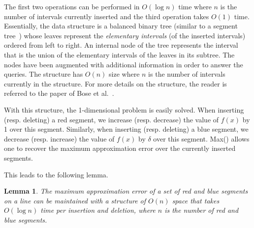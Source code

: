 \documentclass{elsart}
\newtheorem{lemma}[definition]{Lemma}
\begin{document}
The first two operations can be performed in $O(\log n)$ time where
$n$ is the number of intervals currently inserted and the third
operation takes $O(1)$ time.
  Essentially, the data structure is a
  balanced binary tree (similar to a segment tree~\cite{bkos-cgaa-97}) whose
  leaves represent the \emph{elementary intervals} (of the inserted
  intervals) ordered from left to right. An internal node of the tree
  represents the interval that is the union of the elementary intervals
  of the leaves in its subtree.  The nodes have been augmented with
  additional information in order to answer the queries. The structure
  has $O(n)$ size where $n$ is the number of intervals currently in the
  structure. For more details on the structure, the reader is referred
  to the paper of Bose et al.~\cite{bkmmm-trgps-01}.

With this structure, the 1-dimensional problem is easily solved. When
inserting (resp.  deleting) a red segment, we increase
(resp. decrease) the value of $f(x)$ by 1 over this
segment. Similarly, when inserting (resp. deleting) a blue segment, we
decrease (resp. increase) the value of $f(x)$ by $\delta$ over this
segment. Max() allows one to recover the maximum
approximation error over the currently inserted segments.


This leads to the following lemma.
\begin{lemma}\label{le:1d_dynamic}
The maximum approximation error of a set of red and blue segments on a
line can be maintained with a structure of $O(n)$ space that takes
$O(\log n)$ time per insertion and deletion, where $n$ is the number
of red and blue segments.
\end{lemma}
\end{document}
